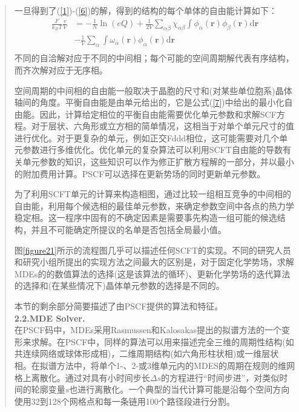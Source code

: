 \documentclass{article}
\begin{document}
\begin{CJK}{UTF8}{gkai}
\begin{quotation}
一旦得到了(\ref{1})-(\ref{6})的解，得到的结构的每个单体的自由能计算如下：
\begin{equation}\label{7}
\begin{aligned}
\frac{F}{k_BT}\frac{v}{V} & =  -\frac{1}{N}\ln (eQ)+\frac{1}{2V}\sum _{\alpha \beta} \chi_{\alpha \beta}\int \phi_{\alpha}(\mathbf{r})\phi_{\beta}(\mathbf{r}) \mathrm{d}\mathbf{r}\\
& - \frac{1}{V}\sum _{\alpha} \int \omega_{\alpha}(\mathbf{r})\phi_{\alpha}(\mathbf{r})\mathrm{d}\mathbf{r}\\
\end{aligned}
\end{equation}
不同的自洽解对应于不同的中间相；每个可能的空间周期解代表有序结构，而齐次解对应于无序相。

空间周期的中间相的自由能一般取决于晶胞的尺寸和(对某些单位胞系)晶体轴间的角度。平衡自由能是由单元给出的，它是公式(\ref{7})中给出的最小化自由能。因此，计算给定相位的平衡自由能需要优化单元参数和求解SCF方程。对于层状、六角形或立方相的简单情况，这相当于对单个单元尺寸的值进行优化。对于更复杂的单元，例如正交Fddd相位，这可能需要对几个单元参数进行多维优化。优化单元的复杂算法可以利用SCFT自由能的导数有关单元参数的知识，这些知识可以作为修正扩散方程解的一部分，并以最小的附加费用计算。PSCF可以选择在更新势场的同时更新单元参数。

为了利用SCFT单元的计算来构造相图，通过比较一组相互竞争的中间相的自由能，利用每个候选相的最佳单元参数，来确定参数空间中各点的热力学稳定相。这一程序中固有的不确定因素是需要事先构造一组可能的候选结构，并且不可能确定所提议的名单是否包括全局最小值。

图\ref{figure21}所示的流程图几乎可以描述任何SCFT的实现。不同的研究人员和研究小组所提出的实现方法之间最大的区别是，对于固定化学势场，求解MDEs的的数值算法的选择(这是该算法的循环)、更新化学势场的迭代算法的选择和(在某些情况下)晶体单元参数的选择是不同的。

本节的剩余部分简要描述了由PSCF提供的算法和特征。\\
\textbf{2.2.MDE Solver.}\\
在PSCF码中，MDEs采用Rasmussen和Kalosakas提出的拟谱方法的一个变形来求解。在PSCF中，同样的算法可以用来描述完全三维的周期性结构(如共连续网络或球体形成相)，二维周期结构(如六角形柱状相)或一维层状相。在拟谱方法中，将单个1-、2-或3维单元内的MDES的周期在规则的维网格上离散化。通过对具有小时间步长$\Delta s$的方程进行“时间步进”，对类似时间的轮廓变量$s$也进行离散化。一个典型的当代计算可能是沿每个空间方向使用32到128个网格点和每一条链用100个路径段进行分割。


\end{quotation}
\end{CJK}
\end{document}
